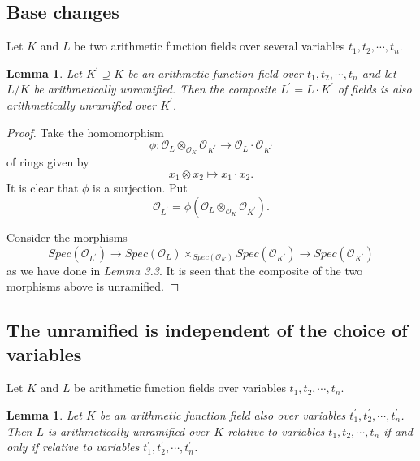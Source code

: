 \documentclass{amsart}
\newtheorem{lemma}[theorem]{Lemma}
\theoremstyle{definition}
\numberwithin{equation}{section}
\begin{document}
\subsection{Base changes}

Let $K$ and $L$ be two arithmetic function fields over several variables $
t_{1},t_{2},\cdots, t_{n}$.

\begin{lemma}
Let $K^{\prime}\supseteq K$ be an arithmetic function field over  $
t_{1},t_{2},\cdots, t_{n}$ and let $L/K$ be arithmetically unramified. Then the composite $L^{\prime}=L\cdot K^{\prime}$ of fields is
also arithmetically unramified over $K^{\prime}$.
\end{lemma}

\begin{proof}
Take the homomorphism
\begin{equation*}
\phi:\mathcal{O}_{L}\otimes_{\mathcal{O}_{K}}\mathcal{O}_{K^{\prime}}\to
\mathcal{O}_{L}\cdot \mathcal{O}_{K^{\prime}}
\end{equation*}
of rings given by
\begin{equation*}
x_{1}\otimes x_{2}\mapsto x_{1}\cdot x_{2}.
\end{equation*}
It is clear that $\phi$ is a surjection. Put
\begin{equation*}
\mathcal{O}_{L^{\prime}}=\phi(\mathcal{O}_{L}\otimes _{\mathcal{O}_{K}}
\mathcal{O} _{K^{\prime}}).
\end{equation*}

Consider the morphisms
\begin{equation*}
Spec(\mathcal{O}_{L^{\prime}})\to Spec(\mathcal{O}_{L})\times _{Spec(\mathcal{O} _{K})} Spec(\mathcal{O}_{K^{\prime}})\to Spec( \mathcal{O}_{K^{\prime}})
\end{equation*}
as we have done in \emph{Lemma 3.3}. It is seen that the composite of the two morphisms
above is unramified.
\end{proof}

\subsection{The unramified is independent of the choice of variables}

Let $K$ and $ L$ be arithmetic function fields over variables $t_{1},t_{2},\cdots, t_{n}$.

\begin{lemma}
Let $K$ be an arithmetic function field also over variables $t_{1}^{\prime},t_{2}^{\prime},\cdots, t_{n}^{\prime}$. Then $L$ is
arithmetically unramified over $K$ relative to variables $t_{1},t_{2},\cdots, t_{n}$ if and only if relative to variables $t_{1}^{\prime},t_{2}^{\prime},\cdots, t_{n}^{\prime}$.
\end{lemma}
\end{document}
